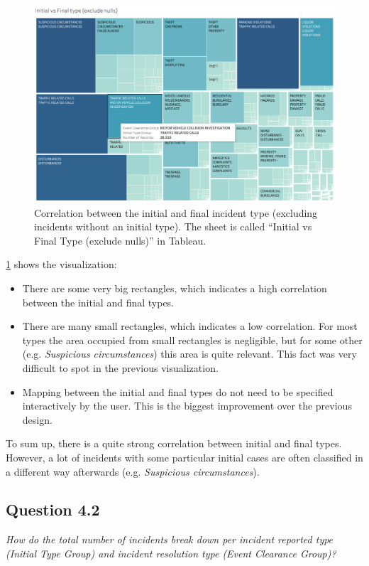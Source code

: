 \begin{figure}[h]
	\centering
	\includegraphics[width=\columnwidth]{figures/4_1_initial_vs_final_group_treemap}
	\caption{Correlation between the initial and final incident type (excluding incidents without an initial type). The sheet is called ``Initial vs Final Type (exclude nulls)'' in Tableau.}
	\label{fig:4_1_initial_vs_final_group_treemap}
\end{figure}

\cref{fig:4_1_initial_vs_final_group_treemap} shows the visualization:
\begin{itemize}
	\item There are some very big rectangles, which indicates a high correlation between the initial and final types.
	\item There are many small rectangles, which indicates a low correlation. For most types the area occupied from small rectangles is negligible, but for some other (e.g. \textit{Suspicious circumstances}) this area is quite relevant. This fact was very difficult to spot in the previous visualization.
	\item Mapping between the initial and final types do not need to be specified interactively by the user. This is the biggest improvement over the previous design.
\end{itemize}

To sum up, there is a quite strong correlation between initial and final types.
However, a lot of incidents with some particular initial cases are often classified in a different way afterwards (e.g. \textit{Suspicious circumstances}).

\subsection*{Question 4.2}
\textit{How do the total number of incidents break down per incident reported type (Initial Type Group) and incident resolution type (Event Clearance Group)?}


